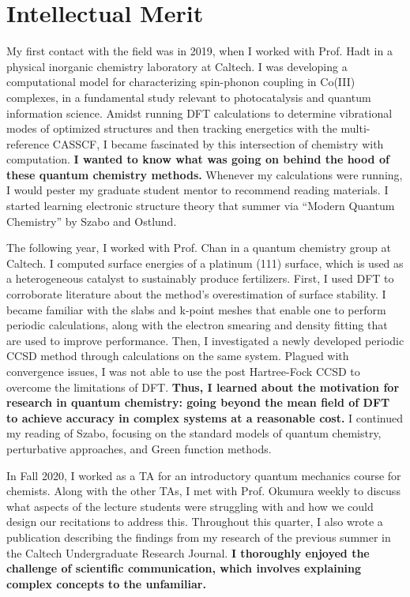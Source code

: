 \documentclass[11pt]{article} %
\begin{document}
\section{Intellectual Merit}
My first contact with the field was in 2019, when I worked with Prof. Hadt in a physical inorganic chemistry laboratory at Caltech. I was developing a computational model for characterizing spin-phonon coupling in Co(III) complexes, in a fundamental study relevant to photocatalysis and quantum information science. Amidst running DFT calculations to determine vibrational modes of optimized structures and then tracking energetics with the multi-reference CASSCF, I became fascinated by this intersection of chemistry with computation. \textbf{I wanted to know what was going on behind the hood of these quantum chemistry methods.} Whenever my calculations were running, I would pester my graduate student mentor to recommend reading materials. I started learning electronic structure theory that summer via “Modern Quantum Chemistry” by Szabo and Ostlund.

The following year, I worked with Prof. Chan in a quantum chemistry group at Caltech. I computed surface energies of a platinum (111) surface, which is used as a heterogeneous catalyst to sustainably produce fertilizers. First, I used DFT to corroborate literature about the method's overestimation of surface stability. I became familiar with the slabs and k-point meshes that enable one to perform periodic calculations, along with the electron smearing and density fitting that are used to improve performance. Then, I investigated a newly developed periodic CCSD method through calculations on the same system. Plagued with convergence issues, I was not able to use the post Hartree-Fock CCSD to overcome the limitations of DFT. \textbf{Thus, I learned about the motivation for research in quantum chemistry: going beyond the mean field of DFT to achieve accuracy in complex systems at a reasonable cost.} I continued my reading of Szabo, focusing on the standard models of quantum chemistry, perturbative approaches, and Green function methods.

In Fall 2020, I worked as a TA for an introductory quantum mechanics course for chemists. Along with the other TAs, I met with Prof. Okumura weekly to discuss what aspects of the lecture students were struggling with and how we could design our recitations to address this. Throughout this quarter, I also wrote a publication describing the findings from my research of the previous summer in the Caltech Undergraduate Research Journal. \textbf{I thoroughly enjoyed the challenge of scientific communication, which involves explaining complex concepts to the unfamiliar.}
\end{document}
